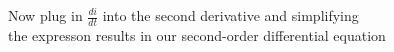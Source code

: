 \documentclass[preview]{standalone}
\begin{document}
\begin{center}
\raggedright
                Now plug in $\frac{di}{dt}$ into the second derivative and simplifying \\
                the expresson results in our second-order differential equation
\end{center}
\end{document}
